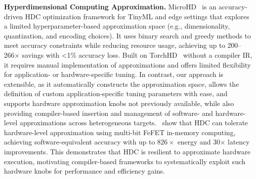 \textbf{Hyperdimensional Computing Approximation.}
MicroHD~\cite{microhd} is an accuracy-driven HDC optimization framework for TinyML and edge settings that explores a limited hyperparameter-based approximation space (e.g., dimensionality, quantization, and encoding choices). It uses binary search and greedy methods to meet accuracy constraints while reducing resource usage, achieving up to 200–266× savings with <1\% accuracy loss. Built on TorchHD~\cite{torchhd} without a compiler IR, it requires manual implementation of approximations and offers limited flexibility for application- or hardware-specific tuning.
In contrast, our approach is extensible, as it automatically constructs the approximation space, allows the definition of custom application-specific tuning parameters with ease, and supports hardware approximation knobs not previously available, while also providing compiler-based insertion and management of software- and hardware-level approximations across heterogeneous targets.~\cite{kazemi2022achieving} show that HDC can tolerate hardware-level approximation using multi-bit FeFET in-memory computing, achieving software-equivalent accuracy with up to $826\times$ energy and 30× latency improvements. This demonstrates that HDC is resilient to approximate hardware execution, motivating compiler-based frameworks to systematically exploit such hardware knobs for performance and efficiency gains.


